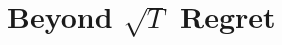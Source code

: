 \documentclass[../main]{subfiles}
\begin{document}
\setcounter{chapter}{3}

\chapter{Beyond $ \sqrt{T} $ Regret}






\end{document}
